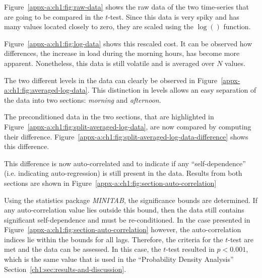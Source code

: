

Figure~\ref{appx-a:ch1:fig:raw-data} shows the raw data of the two time-series that are going to be compared in the $t$-test.
Since this data is very spiky and has many values located closely to zero, they are scaled using the $\log()$ function.



Figure~\ref{appx-a:ch1:fig:log-data} shows this rescaled cost.
It can be observed how differences,  the increase in load during the morning hours, has become more apparent.
Nonetheless, this data is still volatile and is averaged over $N$ values.



The two different levels in the data can clearly be observed in Figure~\ref{appx-a:ch1:fig:averaged-log-data}.
This distinction in levels allows an easy separation of the data into two sections: \textit{morning} and \textit{afternoon}.



The preconditioned data in the two sections, that are highlighted in Figure~\ref{appx-a:ch1:fig:split-averaged-log-data}, are now compared by computing their difference.
Figure~\ref{appx-a:ch1:fig:split-averaged-log-data-difference} shows this difference.



This difference is now auto-correlated and to indicate if any ``self-dependence'' (i.e. indicating auto-regression) is still present in the data.
Results from both sections are shown in Figure~\ref{appx-a:ch1:fig:section-auto-correlation}



Using the statistics package \textit{MINITAB}, the significance bounds are determined.
If any auto-correlation value lies outside this bound, then the data still contains significant self-dependence and must be re-conditioned.
In the case presented in Figure~\ref{appx-a:ch1:fig:section-auto-correlation} however, the auto-correlation indices lie within the bounds for all lags.
Therefore, the criteria for the $t$-test are met and the data can be assessed.
In this case, the $t$-test resulted in $p<0.001$, which is the same value that is used in the ``Probability Density Analysis'' Section~\ref{ch1:sec:results-and-discussion}.





